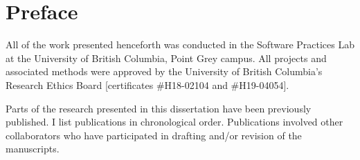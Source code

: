 
\chapter{Preface}

All of the work presented henceforth was conducted in the Software Practices
Lab at the University of British Columbia, Point Grey campus.
All projects and associated methods were approved by the University of British Columbia's Research
Ethics Board [certificates \#H18-02104 and \#H19-04054].



Parts of the research presented in this dissertation have been previously published.
I list publications in chronological order. Publications
involved other collaborators who have participated in drafting and/or revision of the manuscripts. 


